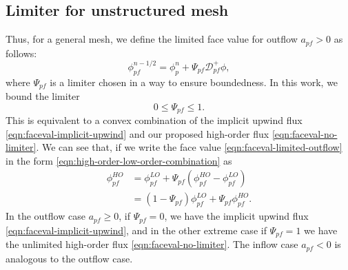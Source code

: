 \documentclass[../thesis.tex]{subfiles}
\begin{document}
\subsection{Limiter for unstructured mesh}
Thus, for a general mesh, we define the limited face value for outflow \(a_{pf} > 0\)
as follows:
\begin{equation}\label{eqn:faceval-limited-outflow}
	\phi_{pf}^{n-1/2} = \phi_p^n + \Psi_{pf} \mathcal{D}^+_{pf}\phi,
\end{equation}
where \(\Psi_{pf}\) is a limiter chosen in a way to ensure boundedness. In this work,
we bound the limiter
\begin{equation}\label{eqn:limiter-upper-lower-bound}
	0 \leq \Psi_{pf} \leq 1.
\end{equation}
This is equivalent to a convex combination of the
implicit upwind flux \eqref{eqn:faceval-implicit-upwind} and our proposed
high-order flux \eqref{eqn:faceval-no-limiter}.
We can see that, if we write the face value \eqref{eqn:faceval-limited-outflow}
in the form \eqref{eqn:high-order-low-order-combination} as
\begin{equation}
	\begin{split}
		\phi_{pf}^{HO}
		&= \phi_{pf}^{LO} + \Psi_{pf}(\phi_{pf}^{HO} - \phi_{pf}^{LO})\\
		&= \left( 1 - \Psi_{pf} \right)\phi_{pf}^{LO} + \Psi_{pf}\phi_{pf}^{HO}.
	\end{split}
\end{equation}
In the outflow case \(a_{pf} \geq 0\), if \(\Psi_{pf} = 0\), we have the implicit
upwind flux \eqref{eqn:faceval-implicit-upwind}, and in the other extreme case
if \(\Psi_{pf} = 1\) we have the unlimited high-order flux
\eqref{eqn:faceval-no-limiter}. The inflow case \(a_{pf} < 0\) is analogous to the outflow case.
\end{document}
